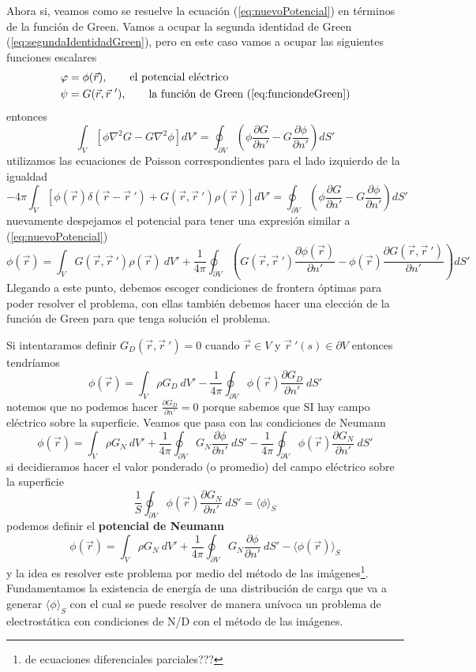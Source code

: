 \documentclass[11pt,a4paper]{article}
\begin{document}
Ahora si, veamos como se resuelve la ecuación (\ref{eq:nuevoPotencial}) en términos de la función de Green. Vamos a ocupar la segunda identidad de Green (\ref{eq:segundaIdentidadGreen}), pero en este caso vamos a ocupar las siguientes funciones escalares
\begin{align*}
\varphi&=\phi(\vec{r}),\qquad\text{el potencial eléctrico}\\
\psi&=G(\vec{r},\vec{r}\ '),\qquad\text{la función de Green (\ref{eq:funciondeGreen})}
\end{align*}
entonces
$$\int_V\left[\phi\nabla^2G-G\nabla^2\phi\right]dV'=\oint_{\partial V}\left(\phi\frac{\partial G}{\partial n'}-G\frac{\partial \phi}{\partial n'}\right)dS'$$
utilizamos las ecuaciones de Poisson correspondientes para el lado izquierdo de la igualdad
$$-4\pi\int_V\left [\phi(\vec{r})\delta(\vec{r}-\vec{r}\ ')+G(\vec{r},\vec{r}\ ')\rho(\vec{r})\right ]dV'=\oint_{\partial V}\left(\phi\frac{\partial G}{\partial n'}-G\frac{\partial \phi}{\partial n'}\right)dS'$$
nuevamente despejamos el potencial para tener una expresión similar a (\ref{eq:nuevoPotencial})
$$\phi(\vec{r})=\int_VG(\vec{r},\vec{r}\ ')\rho(\vec{r})\ dV'+\frac{1}{4\pi}\oint_{\partial V}\left(G(\vec{r},\vec{r}\ ')\frac{\partial\phi(\vec{r})}{\partial n'}-\phi(\vec{r})\frac{\partial G(\vec{r},\vec{r}\ ')}{\partial n'}\right)dS'$$
Llegando a este punto, debemos escoger condiciones de frontera óptimas para poder resolver el problema, con ellas también debemos hacer una elección de la función de Green para que tenga solución el problema.

Si intentaramos definir $G_D(\vec{r},\vec{r}\ ')=0$ cuando $\vec{r}\in V$ y $\vec{r}\ '(s)\in\partial V$ entonces tendríamos
$$\phi(\vec{r})=\int_V\rho G_D\ dV'-\frac{1}{4\pi}\oint_{\partial V}\phi(\vec{r})\frac{\partial G_D}{\partial n'}\ dS'$$
notemos que no podemos hacer $\frac{\partial G_D}{\partial n'}=0$ porque sabemos que SI hay campo eléctrico sobre la superficie. Veamos que pasa con las condiciones de Neumann
$$\phi(\vec{r})=\int_V\rho G_N\ dV'+\frac{1}{4\pi}\oint_{\partial V}G_N\frac{\partial \phi}{\partial n'}\ dS'-\frac{1}{4\pi}\oint_{\partial V}\phi(\vec{r})\frac{\partial G_N}{\partial n'}\ dS'$$
si decidieramos hacer el valor ponderado (o promedio) del campo eléctrico sobre la superficie 
$$\frac{1}{S}\oint_{\partial V}\phi(\vec{r})\frac{\partial G_N}{\partial n'}\ dS'=\langle\phi\rangle_S$$
podemos definir el \textbf{potencial de Neumann}
$$\phi(\vec{r})=\int_V\rho G_N\ dV'+\frac{1}{4\pi}\oint_{\partial V}G_N\frac{\partial \phi}{\partial n'}\ dS'-\langle\phi(\vec{r})\rangle_S$$
y la idea es resolver este problema por medio del método de las imágenes\footnote{de ecuaciones diferenciales parciales???}. Fundamentamos la existencia de energía de una distribución de carga que va a generar $\langle\phi\rangle_S$ con el cual se puede resolver de manera unívoca un problema de electrostática con condiciones de N/D con el método de las imágenes.
\end{document}
